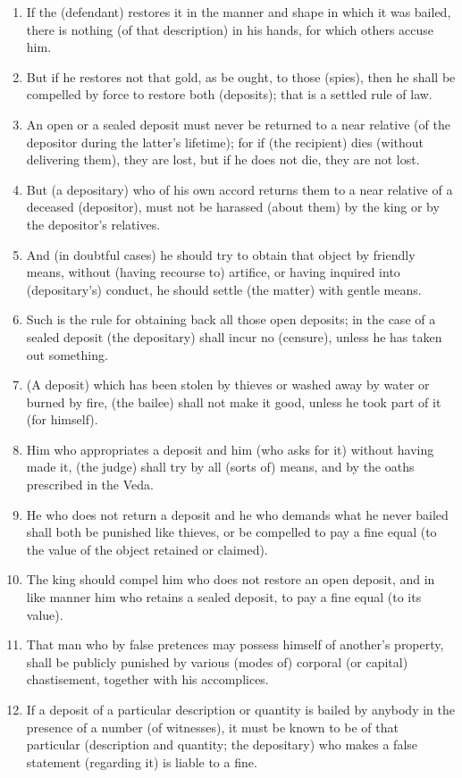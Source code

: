 \begin{enumerate}
\item If the (defendant) restores it in the manner and shape in which it was bailed, there is nothing (of that description) in his hands, for which others accuse him.
\item But if he restores not that gold, as be ought, to those (spies), then he shall be compelled by force to restore both (deposits); that is a settled rule of law.
\item An open or a sealed deposit must never be returned to a near relative (of the depositor during the latter's lifetime); for if (the recipient) dies (without delivering them), they are lost, but if he does not die, they are not lost.
\item But (a depositary) who of his own accord returns them to a near relative of a deceased (depositor), must not be harassed (about them) by the king or by the depositor's relatives.
\item And (in doubtful cases) he should try to obtain that object by friendly means, without (having recourse to) artifice, or having inquired into (depositary's) conduct, he should settle (the matter) with gentle means.
\item Such is the rule for obtaining back all those open deposits; in the case of a sealed deposit (the depositary) shall incur no (censure), unless he has taken out something.
\item (A deposit) which has been stolen by thieves or washed away by water or burned by fire, (the bailee) shall not make it good, unless he took part of it (for himself).
\item Him who appropriates a deposit and him (who asks for it) without having made it, (the judge) shall try by all (sorts of) means, and by the oaths prescribed in the Veda.
\item He who does not return a deposit and he who demands what he never bailed shall both be punished like thieves, or be compelled to pay a fine equal (to the value of the object retained or claimed).
\item The king should compel him who does not restore an open deposit, and in like manner him who retains a sealed deposit, to pay a fine equal (to its value).
\item That man who by false pretences may possess himself of another's property, shall be publicly punished by various (modes of) corporal (or capital) chastisement, together with his accomplices.
\item If a deposit of a particular description or quantity is bailed by anybody in the presence of a number (of witnesses), it must be known to be of that particular (description and quantity; the depositary) who makes a false statement (regarding it) is liable to a fine.

\end{enumerate}
